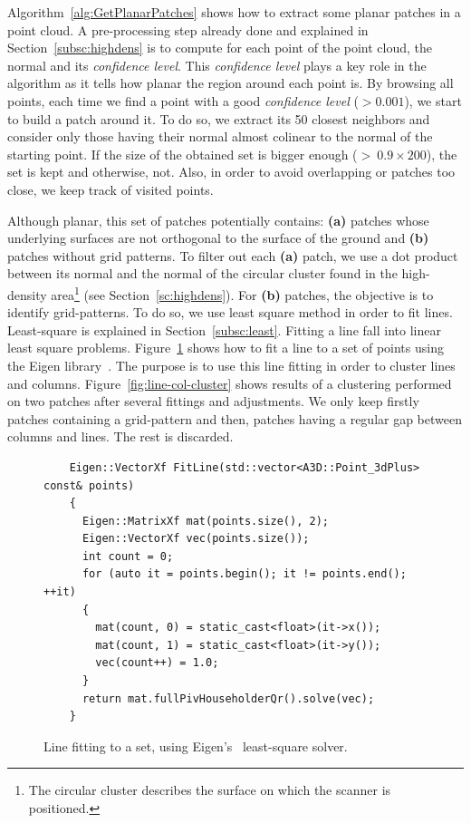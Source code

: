 Algorithm~\ref{alg:GetPlanarPatches} shows how to extract some planar patches in a point cloud. A pre-processing step already done and explained in Section~\ref{subsc:highdens} is to compute for each point of the point cloud, the normal and its \emph{confidence level}. This \emph{confidence level} plays a key role in the algorithm as it tells how planar the region around each point is. By browsing all points, each time we find a point with a good \emph{confidence level} ($> 0.001$), we start to build a patch around it. To do so, we extract its 50
closest neighbors and consider only those having their normal almost colinear to the normal of the starting point. If the size of the obtained set is bigger enough ($>\ 0.9 \times 200$), the set is kept and otherwise, not. Also, in order to avoid overlapping or patches too close, we keep track of visited points.

Although planar, this set of patches potentially contains: \textbf{(a)} patches whose underlying surfaces are not orthogonal to the surface of the ground and \textbf{(b)} patches without grid patterns. To filter out each \textbf{(a)} patch, we use a dot product between its normal and the normal of the circular cluster found in the high-density area\footnote{The circular cluster describes the surface on which the scanner is positioned.} (see Section~\ref{sc:highdens}). For \textbf{(b)} patches,
the objective is to identify grid-patterns. To do so, we use least square method in order to fit lines. Least-square is explained in Section~\ref{subsc:least}. Fitting a line fall into linear least square problems. Figure~\ref{fig:fitline} shows how to fit a line to a set of points using the Eigen library~\cite{eigenweb}. The purpose is to use this line fitting in order to cluster lines and columns. Figure~\ref{fig:line-col-cluster} shows results of a clustering performed on two patches after several fittings and adjustments. We only keep firstly patches containing a grid-pattern and then, patches having a regular gap between columns and lines. The rest is discarded.

\begin{figure}
  \centering
  \begin{lstlisting}
    Eigen::VectorXf FitLine(std::vector<A3D::Point_3dPlus> const& points)
    {
      Eigen::MatrixXf mat(points.size(), 2);
      Eigen::VectorXf vec(points.size());
      int count = 0;
      for (auto it = points.begin(); it != points.end(); ++it)
      {
        mat(count, 0) = static_cast<float>(it->x());
        mat(count, 1) = static_cast<float>(it->y());
        vec(count++) = 1.0;
      }
      return mat.fullPivHouseholderQr().solve(vec);
    }
  \end{lstlisting}
  \caption{Line fitting to a set, using Eigen's~\cite{eigenweb} least-square solver.}
  \label{fig:fitline}
\end{figure}

